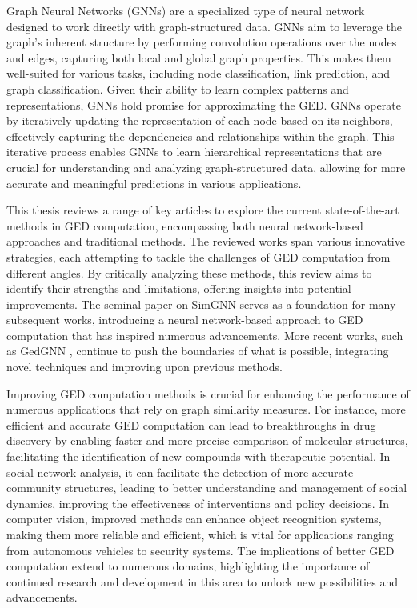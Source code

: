 \documentclass[../Thesis.tex]{subfiles}
\begin{document}
	Graph Neural Networks (GNNs) are a specialized type of neural network designed to work directly with graph-structured data. GNNs aim to leverage the graph's inherent structure by performing convolution operations over the nodes and edges, capturing both local and global graph properties. This makes them well-suited for various tasks, including node classification, link prediction, and graph classification. Given their ability to learn complex patterns and representations, GNNs hold promise for approximating the GED. GNNs operate by iteratively updating the representation of each node based on its neighbors, effectively capturing the dependencies and relationships within the graph. This iterative process enables GNNs to learn hierarchical representations that are crucial for understanding and analyzing graph-structured data, allowing for more accurate and meaningful predictions in various applications.
	
	This thesis reviews a range of key articles to explore the current state-of-the-art methods in GED computation, encompassing both neural network-based approaches and traditional methods. The reviewed works span various innovative strategies, each attempting to tackle the challenges of GED computation from different angles. By critically analyzing these methods, this review aims to identify their strengths and limitations, offering insights into potential improvements. The seminal paper on SimGNN \cite{simgnn__a_neural_network_approach_to_fast_graph_similarity_computation} serves as a foundation for many subsequent works, introducing a neural network-based approach to GED computation that has inspired numerous advancements. More recent works, such as GedGNN \cite{computing_graph_edit_distance_via_neural_graph_matching}, continue to push the boundaries of what is possible, integrating novel techniques and improving upon previous methods.
	
	Improving GED computation methods is crucial for enhancing the performance of numerous applications that rely on graph similarity measures. For instance, more efficient and accurate GED computation can lead to breakthroughs in drug discovery by enabling faster and more precise comparison of molecular structures, facilitating the identification of new compounds with therapeutic potential. In social network analysis, it can facilitate the detection of more accurate community structures, leading to better understanding and management of social dynamics, improving the effectiveness of interventions and policy decisions. In computer vision, improved methods can enhance object recognition systems, making them more reliable and efficient, which is vital for applications ranging from autonomous vehicles to security systems. The implications of better GED computation extend to numerous domains, highlighting the importance of continued research and development in this area to unlock new possibilities and advancements.
	
\end{document}
